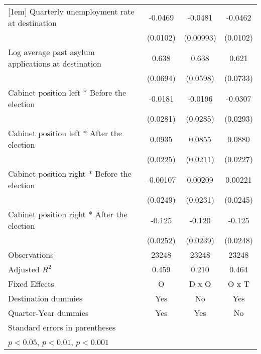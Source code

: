 \begin{table}[htbp]
\begin{tabular}{l*{3}{c}}
[1em]
Quarterly unemployment rate at destination&     -0.0469\sym{***}&     -0.0481\sym{***}&     -0.0462\sym{***}\\
                    &    (0.0102)         &   (0.00993)         &    (0.0102)         \\
[1em]
Log average past asylum applications at destination&       0.638\sym{***}&       0.638\sym{***}&       0.621\sym{***}\\
                    &    (0.0694)         &    (0.0598)         &    (0.0733)         \\
[1em]
Cabinet position left * Before the election&     -0.0181         &     -0.0196         &     -0.0307         \\
                    &    (0.0281)         &    (0.0285)         &    (0.0293)         \\
[1em]
Cabinet position left * After the election&      0.0935\sym{***}&      0.0855\sym{***}&      0.0880\sym{***}\\
                    &    (0.0225)         &    (0.0211)         &    (0.0227)         \\
[1em]
Cabinet position right * Before the election&    -0.00107         &     0.00209         &     0.00221         \\
                    &    (0.0249)         &    (0.0231)         &    (0.0245)         \\
[1em]
Cabinet position right * After the election&      -0.125\sym{***}&      -0.120\sym{***}&      -0.125\sym{***}\\
                    &    (0.0252)         &    (0.0239)         &    (0.0248)         \\
\hline
Observations        &       23248         &       23248         &       23248         \\
Adjusted \(R^{2}\)  &       0.459         &       0.210         &       0.464         \\
Fixed Effects       &           O         &       D x O         &       O x T         \\
Destination dummies &         Yes         &          No         &         Yes         \\
Quarter-Year dummies&         Yes         &         Yes         &          No         \\
\hline\hline
\multicolumn{4}{l}{\footnotesize Standard errors in parentheses}\\
\multicolumn{4}{l}{\footnotesize \sym{*} \(p<0.05\), \sym{**} \(p<0.01\), \sym{***} \(p<0.001\)}\\
\end{tabular}
\end{table}
